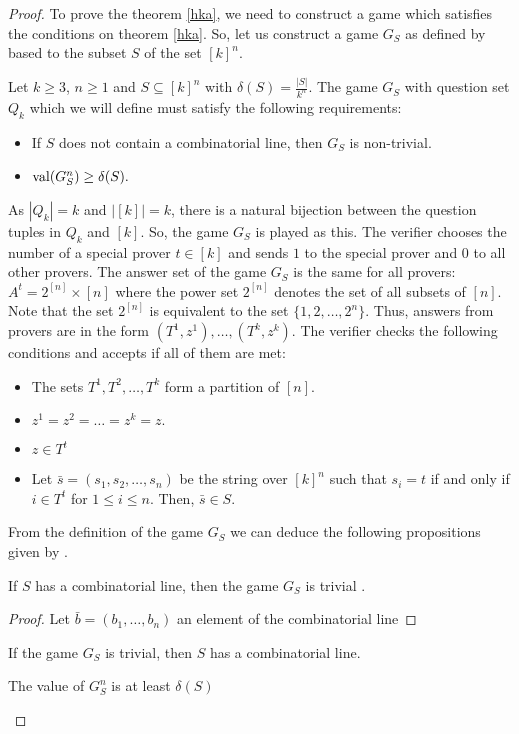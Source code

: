 \begin{proof}
To prove  the theorem \eqref{hka}, we need to construct a game which  satisfies the conditions on theorem \eqref{hka}. So, let us construct a game $G_S$   as  defined by \cite{hkazla2016forbidden} based to the subset $S $ of the set $[k]^n$. 

Let $k \geq 3$, $n \geq 1$ and $S \subseteq [k]^n$ with $\delta (S)= \frac{|S|}{k^n}$. The game $G_S$ with question set $Q_k$ which we will define must satisfy the  following requirements: 
\begin{itemize}
\item If $S$ does not contain a combinatorial line, then $G_S$ is non-trivial. \item $\mathrm{val} (G_S^n) \geq \delta (S).$
\end{itemize}

As $|Q_k|=k$ and $|[k]|=k$, there is a natural bijection between the question tuples in $Q_k$ and $[k]$. So, the game $G_S$ is played as this. The verifier chooses the number of a special prover $t \in [k]$   and sends $1$ to the special prover and $0$ to all other provers. 
The answer set of the game $G_S$ is the same for all provers: $A^t=2^{[n]} \times [n]$ where the power set  $2^{[n]}$ denotes the set of all subsets of $[n]$. Note that the set $2^{[n]}$ is equivalent to the set $\{1,2,\ldots, 2^n\}.$ Thus, answers from provers are in the form $(T^1, z^1), \ldots, (T^k, z^k)$. The verifier checks the following conditions and accepts if all of them are met: 
\begin{itemize}
\item The sets $T^1, T^2,\ldots, T^k$ form a partition of $[n].$
\item $z^1=z^2=\ldots=z^k=z.$
\item $z \in T^t$
\item Let $\bar{s} = (s_1, s_2, \ldots, s_n)$ be the string over $[k]^n$ such that  $s_i = t$ if and only if $i \in  T ^t$ for $1\leq i \leq n.$ Then, $\bar{s} \in S.$
\end{itemize}

From the definition of the game $G_S$ we can deduce the following propositions given by \cite{hkazla2016forbidden}.
\begin{pro} If $S$ has a combinatorial line, then the game $G_S$ is trivial	. \label{pr1}	\end{pro}
\begin{proof}
Let $\bar{b}=(b_1,\ldots, b_n)$ an element of the combinatorial line 
\end{proof}
\begin{pro} If the game $G_S$ is trivial, then $S$ has a combinatorial line.	 \label{pr2}	\end{pro}

\begin{pro}	 The value of $G_S^n$ is at least $\delta(S)$	  \label{pr3} \end{pro}
\end{proof}



